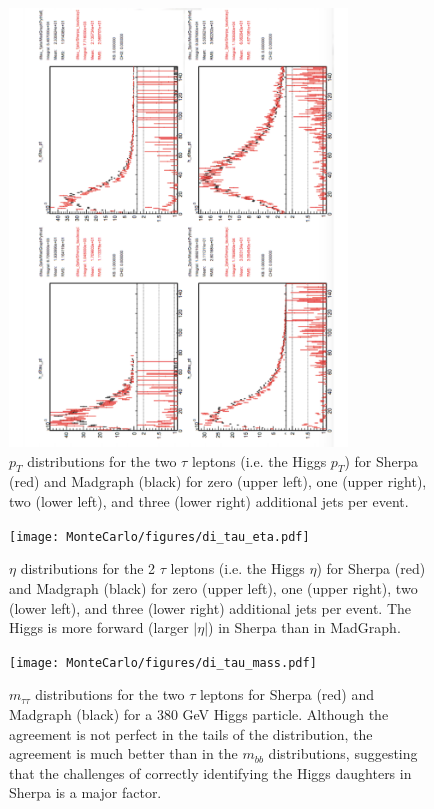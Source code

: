 \begin{figure}
  \center
  \includegraphics[width=0.8\textwidth, angle=270]{MonteCarlo/figures/di_tau_pt.pdf}
  \caption{$p_T$ distributions for the two $\tau$ leptons (i.e. the Higgs $p_T$) for Sherpa (red) and Madgraph (black) for zero (upper
  left), one (upper right), two (lower left), and three (lower right) additional jets per event. 
  \label{fig:di_tau_pt}}
\end{figure}
\begin{figure}
  \center
  \texttt{[image: MonteCarlo/figures/di\_tau\_eta.pdf]}
  \caption{$\eta$ distributions for the 2 $\tau$ leptons (i.e. the Higgs $\eta$) for Sherpa (red) and Madgraph (black) for zero (upper
  left), one (upper right), two (lower left), and three (lower right) additional jets per event. 
  The Higgs is more forward (larger $|\eta|$) in Sherpa than in MadGraph.  \label{fig:di_tau_eta}}
\end{figure}
\begin{figure}
  \center
  \texttt{[image: MonteCarlo/figures/di\_tau\_mass.pdf]}
  \caption{$m_{\tau\tau}$ distributions for the two $\tau$ leptons for Sherpa (red) and Madgraph (black) 
  for a 380 GeV Higgs particle.  Although the agreement is not perfect in the tails of the distribution,
  the agreement is much better than in the $m_{bb}$ distributions, suggesting that the challenges
  of correctly identifying the Higgs daughters in Sherpa is a major factor. 
  \label{fig:di_tau_mass}}
\end{figure}


